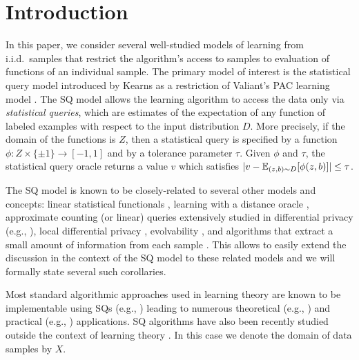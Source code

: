 \section{Introduction}

In this paper, we consider several well-studied models of learning from i.i.d.~samples that restrict the algorithm's access to samples to evaluation of functions of an individual sample. The primary model of interest is the statistical query model introduced by Kearns \cite{kearns1998efficient} as a restriction of Valiant's PAC learning model \cite{valiant1984theory}. The SQ model allows the learning algorithm to access the data only via \emph{statistical queries}, which are estimates of the expectation of any function of labeled examples with respect to the input distribution $D$. More precisely, if the domain of the functions is $Z$, then a statistical query is specified by a function $\phi:Z \times \{\pm 1\} \to [-1,1]$ and by a tolerance parameter $\tau$. Given $\phi$ and $\tau$, the statistical query oracle returns a value $v$ which satisfies $|v - \mathbb E_{(z,b) \sim D}[\phi(z,b)]| \le \tau$.

The SQ model is known to be closely-related to several other models and concepts: linear statistical functionals \cite{wasserman2013all}, learning with a distance oracle \cite{Ben-DavidIK90}, approximate counting (or linear) queries extensively studied in differential privacy (e.g., \cite{DinurN03,BlumDMN05,DworkMNS06,roth2010interactive}), local differential privacy \cite{kasiviswanathan2011can}, evolvability \cite{valiant2009evolvability,feldman2008evolvability}, and algorithms that extract a small amount of information from each sample \cite{Ben-DavidD98,FeldmanGRVX:12,FeldmanPV:13,SteinhardtVW16}. This allows to easily extend the discussion in the context of the SQ model to these related models and we will formally state several such corollaries.%

Most standard algorithmic approaches used in learning theory are known to be implementable using SQs (e.g., \cite{blum1998polynomial,DunaganV04,BlumDMN05,chu2007map,FeldmanPV:13,BalcanF15,FeldmanGV:15}) leading to numerous  theoretical (e.g., \cite{BalcanBFM12,de2015learning,dwork2015preserving}) and practical (e.g., \cite{chu2007map,roy2010airavat,sujeeth2011optiml,dwork2015generalization}) applications. SQ algorithms have also been recently studied outside the context of learning theory \cite{FeldmanGRVX:12,FeldmanPV:13,FeldmanGV:15}. In this case we denote the domain of data samples by $X$.

